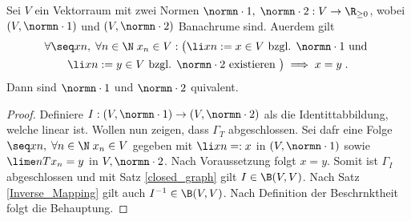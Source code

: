 \begin{theorem}
	Sei $V$ ein Vektorraum mit zwei Normen \(\normn\cdot 1, \;\normn\cdot 2: V \to \R_{\geq 0}\), wobei \((V,\normn\cdot 1)\) und \((V,\normn\cdot 2)\) Banachr\as ume sind. Au\s erdem gilt 
	\begin{multline*}
	\forall \seq xn,\; \forall n \in \N\; x_n \in V:\big( \li xn := x\in V \text{ bzgl. }\normn\cdot 1 \text{ und } \\\li xn := y\in V \text{ bzgl. }\normn\cdot 2 \text{ existieren }\big)  \implies x = y\;.
	\end{multline*}
	Dann sind \(\normn\cdot 1\) und \(\normn\cdot 2\) \as quivalent.
\end{theorem}

\begin{proof}
	Definiere \(I: (V,\normn\cdot1) \to (V,\normn\cdot 2)\) als die Identit\as tabbildung, welche linear ist. Wollen nun zeigen, dass \(\Gamma_T\) abgeschlossen. Sei daf\us r eine Folge \(\seq xn, \;\forall n \in \N\; x_n \in V\) gegeben mit \(\li xn =: x\) in \((V,\normn\cdot 1)\) sowie \(\lime n Tx_n = y\) in \(V,\normn\cdot 2\). Nach Voraussetzung folgt \(x = y\). Somit ist \(\Gamma_I\) abgeschlossen und mit Satz \ref{closed_graph} gilt \(I \in \B(V,V)\). Nach Satz \ref{Inverse_Mapping} gilt auch \(I^{-1} \in \B(V,V)\). Nach Definition der Beschr\as nktheit folgt die Behauptung.
\end{proof}